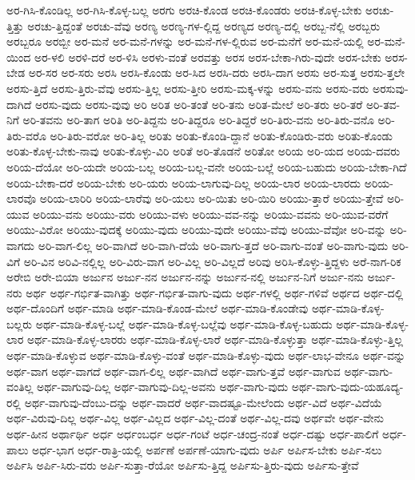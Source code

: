 {ಅರ-ಗಿಸಿ-ಕೊಂಡಿಲ್ಲ
ಅರ-ಗಿಸಿ-ಕೊಳ್ಳ-ಬಲ್ಲ
ಅರಗು
ಅರಚಿ-ಕೊಂಡ
ಅರಚಿ-ಕೊಂಡರು
ಅರಚಿ-ಕೊಳ್ಳ-ಬೇಕು
ಅರಚು-ತ್ತಿತ್ತು
ಅರಚು-ತ್ತಿದ್ದಂತೆ
ಅರಚು-ವೆವು
ಅರಣ್ಯ
ಅರಣ್ಯ-ಗಳ-ಲ್ಲಿದ್ದ
ಅರಣ್ಯದ
ಅರಣ್ಯ-ದಲ್ಲಿ
ಅರಬ್ಬ-ನೆಲ್ಲಿ
ಅರಬ್ಬರು
ಅರಬ್ಬರೂ
ಅರಬ್ಬೀ
ಅರ-ಮನೆ
ಅರ-ಮನೆ-ಗಳನ್ನು
ಅರ-ಮನೆ-ಗಳ-ಲ್ಲಿರುವ
ಅರ-ಮನೆಗೆ
ಅರ-ಮನೆ-ಯಲ್ಲಿ
ಅರ-ಮನೆ-ಯಿಂದ
ಅರ-ಳಲಿ
ಅರಳಿ-ದರೆ
ಅರ-ಳಿಸಿ
ಅರಳು-ವಂತೆ
ಅರವತ್ತು
ಅರಸ
ಅರಸ-ಬೇಕಾ-ಗಿರು-ವುದೇ
ಅರಸ-ಬೇಕು
ಅರಸ-ಬೇಡ
ಅರ-ಸರ
ಅರ-ಸರು
ಅರಸಿ
ಅರಸಿ-ಕೊಂಡು
ಅರ-ಸಿದ
ಅರಸಿ-ದರು
ಅರಸಿ-ದಾಗ
ಅರಸು
ಅರ-ಸುತ್ತ
ಅರಸು-ತ್ತಲೇ
ಅರಸು-ತ್ತಿದೆ
ಅರಸು-ತ್ತಿರು-ವೆವು
ಅರಸು-ತ್ತಿಲ್ಲ
ಅರಸು-ತ್ತೀರಿ
ಅರಸು-ಮಕ್ಕ-ಳನ್ನು
ಅರಸು-ವನು
ಅರಸು-ವರು
ಅರಸುವು-ದಾಗಿದೆ
ಅರಸು-ವುದು
ಅರಸು-ವುವು
ಅರಿ
ಅರಿತ
ಅರಿ-ತಂತೆ
ಅರಿ-ತನು
ಅರಿತ-ಮೇಲೆ
ಅರಿ-ತರು
ಅರಿ-ತರೆ
ಅರಿ-ತವ-ನಿಗೆ
ಅರಿ-ತವನು
ಅರಿ-ತಾಗ
ಅರಿತಿ
ಅರಿ-ತಿದ್ದನು
ಅರಿ-ತಿದ್ದರೂ
ಅರಿ-ತಿದ್ದರೆ
ಅರಿ-ತಿರು-ವನು
ಅರಿ-ತಿರು-ವನೊ
ಅರಿ-ತಿರು-ವರೊ
ಅರಿ-ತಿರು-ವರೋ
ಅರಿ-ತಿಲ್ಲ
ಅರಿತು
ಅರಿತು-ಕೊಂಡಿ-ದ್ದಾನೆ
ಅರಿತು-ಕೊಂಡಿರು-ವರು
ಅರಿತು-ಕೊಂಡು
ಅರಿತು-ಕೊಳ್ಳ-ಬೇಕು-ನಾವು
ಅರಿತು-ಕೊಳ್ಳು-ವಿರಿ
ಅರಿತೆ
ಅರಿ-ತೊಡನೆ
ಅರಿತೋ
ಅರಿಯ
ಅರಿ-ಯದ
ಅರಿಯ-ದವರು
ಅರಿಯ-ದೆಯೋ
ಅರಿ-ಯದೇ
ಅರಿಯ-ಬಲ್ಲ
ಅರಿಯ-ಬಲ್ಲ-ವನೇ
ಅರಿಯ-ಬಲ್ಲೆ
ಅರಿಯ-ಬಹುದು
ಅರಿಯ-ಬೇಕಾ-ಗಿದೆ
ಅರಿಯ-ಬೇಕಾ-ದರೆ
ಅರಿಯ-ಬೇಕು
ಅರಿ-ಯರು
ಅರಿಯ-ಲಾಗುವು-ದಿಲ್ಲ
ಅರಿಯ-ಲಾರ
ಅರಿಯ-ಲಾರದು
ಅರಿಯ-ಲಾರವೊ
ಅರಿಯ-ಲಾರಿರಿ
ಅರಿಯ-ಲಾರೆವು
ಅರಿ-ಯಲು
ಅರಿ-ಯಿತು
ಅರಿ-ಯಿರಿ
ಅರಿಯು-ತ್ತಾರೆ
ಅರಿಯು-ತ್ತೇವೆ
ಅರಿ-ಯುವ
ಅರಿಯು-ವನು
ಅರಿಯು-ವರು
ಅರಿಯು-ವಳು
ಅರಿಯು-ವವ-ನನ್ನು
ಅರಿಯು-ವವನು
ಅರಿ-ಯುವ-ವರೆಗೆ
ಅರಿಯು-ವಿರೋ
ಅರಿಯು-ವುದಕ್ಕೆ
ಅರಿಯು-ವುದು
ಅರಿಯು-ವುದೇ
ಅರಿಯು-ವೆವು
ಅರಿಯು-ವೆವೋ
ಅರಿ-ವನ್ನು
ಅರಿ-ವಾಗದು
ಅರಿ-ವಾಗ-ಲಿಲ್ಲ
ಅರಿ-ವಾಗಿದೆ
ಅರಿ-ವಾಗಿ-ದೆಯೆ
ಅರಿ-ವಾಗು-ತ್ತದೆ
ಅರಿ-ವಾಗು-ವಂತೆ
ಅರಿ-ವಾಗು-ವುದು
ಅರಿ-ವಿಗೆ
ಅರಿ-ವಿನ
ಅರಿವಿ-ನಲ್ಲಿಲ್ಲ
ಅರಿ-ವಿರು-ವಾಗ
ಅರಿ-ವಿಲ್ಲ
ಅರಿ-ವಿಲ್ಲದೆ
ಅರಿವು
ಅರಿಸಿ-ಕೊಳ್ಳು-ತ್ತಿದ್ದಳು
ಅರೆ-ನಾಗ-ರಿಕ
ಅರೇಬಿ
ಅರೇ-ಬಿಯಾ
ಅರ್ಜುನ
ಅರ್ಜು-ನನ
ಅರ್ಜುನ-ನನ್ನು
ಅರ್ಜುನ-ನಲ್ಲಿ
ಅರ್ಜುನ-ನಿಗೆ
ಅರ್ಜು-ನನು
ಅರ್ಜು-ನರು
ಅರ್ಥ
ಅರ್ಥ-ಗರ್ಭಿತ-ವಾಗಿತ್ತು
ಅರ್ಥ-ಗರ್ಭಿತ-ವಾಗು-ವುದು
ಅರ್ಥ-ಗಳಲ್ಲಿ
ಅರ್ಥ-ಗಳಿವೆ
ಅರ್ಥದ
ಅರ್ಥ-ದಲ್ಲಿ
ಅರ್ಥ-ದೊಂದಿಗೆ
ಅರ್ಥ-ಮಾಡಿ
ಅರ್ಥ-ಮಾಡಿ-ಕೊಂಡ-ಮೇಲೆ
ಅರ್ಥ-ಮಾಡಿ-ಕೊಂಡೇವು
ಅರ್ಥ-ಮಾಡಿ-ಕೊಳ್ಳ-ಬಲ್ಲರು
ಅರ್ಥ-ಮಾಡಿ-ಕೊಳ್ಳ-ಬಲ್ಲೆ
ಅರ್ಥ-ಮಾಡಿ-ಕೊಳ್ಳ-ಬಲ್ಲೆವು
ಅರ್ಥ-ಮಾಡಿ-ಕೊಳ್ಳ-ಬಹುದು
ಅರ್ಥ-ಮಾಡಿ-ಕೊಳ್ಳ-ಲಾರ
ಅರ್ಥ-ಮಾಡಿ-ಕೊಳ್ಳ-ಲಾರರು
ಅರ್ಥ-ಮಾಡಿ-ಕೊಳ್ಳ-ಲಾರೆ
ಅರ್ಥ-ಮಾಡಿ-ಕೊಳ್ಳುತ್ತಾ
ಅರ್ಥ-ಮಾಡಿ-ಕೊಳ್ಳು-ತ್ತಿಲ್ಲ
ಅರ್ಥ-ಮಾಡಿ-ಕೊಳ್ಳುವ
ಅರ್ಥ-ಮಾಡಿ-ಕೊಳ್ಳು-ವಂತೆ
ಅರ್ಥ-ಮಾಡಿ-ಕೊಳ್ಳು-ವುದು
ಅರ್ಥ-ಲಾಭ-ವೇನೂ
ಅರ್ಥ-ವನ್ನು
ಅರ್ಥ-ವಾಗ
ಅರ್ಥ-ವಾಗದೆ
ಅರ್ಥ-ವಾಗ-ಲಿಲ್ಲ
ಅರ್ಥ-ವಾಗಿದೆ
ಅರ್ಥ-ವಾಗು-ತ್ತವೆ
ಅರ್ಥ-ವಾಗುವ
ಅರ್ಥ-ವಾಗು-ವಂತಿಲ್ಲ
ಅರ್ಥ-ವಾಗುವು-ದಿಲ್ಲ
ಅರ್ಥ-ವಾಗುವು-ದಿಲ್ಲ-ಅವನು
ಅರ್ಥ-ವಾಗು-ವುದು
ಅರ್ಥ-ವಾಗು-ವುದು-ಯಹೂದ್ಯ-ರಲ್ಲಿ
ಅರ್ಥ-ವಾಗುವು-ದೆಂಬು-ದನ್ನು
ಅರ್ಥ-ವಾದರೆ
ಅರ್ಥ-ವಾದಷ್ಟೂ-ಮೇಲೆಂದು
ಅರ್ಥ-ವಿದೆ
ಅರ್ಥ-ವಿದೆಯೆ
ಅರ್ಥ-ವಿರುವು-ದಿಲ್ಲ
ಅರ್ಥ-ವಿಲ್ಲ
ಅರ್ಥ-ವಿಲ್ಲದ
ಅರ್ಥ-ವಿಲ್ಲ-ದಂತೆ
ಅರ್ಥ-ವಿಲ್ಲ-ದವು
ಅರ್ಥವೇ
ಅರ್ಥ-ವೇನು
ಅರ್ಥ-ಹೀನ
ಅರ್ಥಾರ್ಥಿ
ಅರ್ಧ
ಅರ್ಧಂಬರ್ಧ
ಅರ್ಧ-ಗಂಟೆ
ಅರ್ಧ-ಚಂದ್ರ-ನಂತೆ
ಅರ್ಧ-ದಷ್ಟು
ಅರ್ಧ-ಪಾಲಿಗೆ
ಅರ್ಧ-ಪಾಲು
ಅರ್ಧ-ಭಾಗ
ಅರ್ಧ-ರಾತ್ರಿ-ಯಲ್ಲಿ
ಅರ್ಪಣೆ
ಅರ್ಪಣೆ-ಯಾಗು-ವುದು
ಅರ್ಪಿ
ಅರ್ಪಿಸ-ಬೇಕು
ಅರ್ಪಿ-ಸಲು
ಅರ್ಪಿಸಿ
ಅರ್ಪಿ-ಸಿರು-ವರು
ಅರ್ಪಿ-ಸುತ್ತಾ-ರೆಯೋ
ಅರ್ಪಿಸು-ತ್ತಿದ್ದ
ಅರ್ಪಿಸು-ತ್ತಿರು-ವುದು
ಅರ್ಪಿಸು-ತ್ತೇವೆ
}
